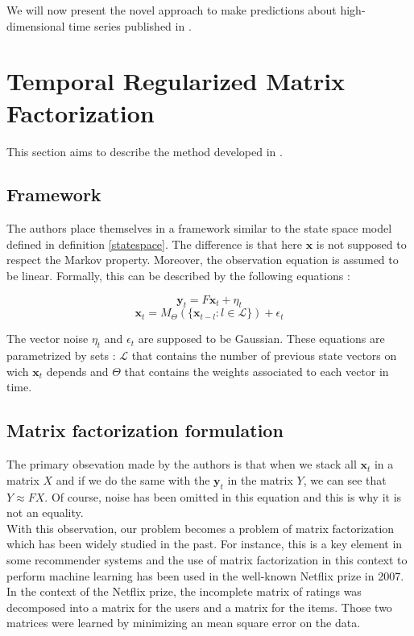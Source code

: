\documentclass{article}
\begin{document}
We will now present the novel approach to make predictions about high-dimensional time series published in \cite{TRMF}.

\section{Temporal Regularized Matrix Factorization}
This section aims to describe the method developed in \cite{TRMF}. \\

\subsection*{Framework}
The authors place themselves in a framework similar to the state space model defined in definition \ref{statespace}.
The difference is that here $\mathbf{x}$ is not supposed to respect the Markov property. Moreover, the observation equation is assumed to be linear.
Formally, this can be described by the following equations :

\begin{equation}
\mathbf{y}_t = F\mathbf{x}_t + \eta_t
\end{equation}
\begin{equation}
\mathbf{x}_t = M_{\Theta}(\{\mathbf{x}_{t-l} : l \in \mathcal{L} \}) + \epsilon_t
\label{eq:evol}
\end{equation}

The vector noise $\eta_t$ and $\epsilon_t$ are supposed to be Gaussian. These equations are parametrized by sets : $\mathcal{L}$ that contains the number of previous state vectors on wich $\mathbf{x}_t$ depends and $\Theta$ that contains the weights associated to each vector in time.

\subsection*{Matrix factorization formulation}
The primary obsevation made by the authors is that when we stack all $\mathbf{x}_t$ in a matrix $X$ and if we do the same with the $\mathbf{y}_t$ in the matrix $Y$, we can see that $Y \approx FX$. Of course, noise has been omitted in this equation and this is why it is not an equality. \\

With this observation, our problem becomes a problem of matrix factorization which has been widely studied in the past. For instance, this is a key element in some recommender systems and the use of matrix factorization in this context to perform machine learning has been used in the well-known Netflix prize in 2007.
In the context of the Netflix prize, the incomplete matrix of ratings was decomposed into a matrix for the users and a matrix for the items. Those two matrices were learned by minimizing an mean square error on the data. \\
\end{document}
